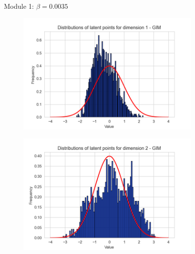 \begin{figure}[h]
\begin{subfigure}[b]{0.25\textwidth}
	\end{subfigure}
	\caption{Module 1: $\beta=0.0035$}
	\label{fig:distr_module1_beta0035}
\end{figure}
\begin{figure}[h]
	\centering
	\begin{subfigure}[b]{0.25\textwidth}
		\centering
		\includegraphics[width=1\linewidth]{"graphs/distr/module2 kld0035/_ distribution_latent_space_GIM_dim=0"}
	\end{subfigure}
	\hfill
	\begin{subfigure}[b]{0.25\textwidth}
		\centering
		\includegraphics[width=1\linewidth]{"graphs/distr/module2 kld0035/_ distribution_latent_space_GIM_dim=1"}
	\end{subfigure}
	\hfill
	\begin{subfigure}[b]{0.25\textwidth}
		\centering

\end{subfigure}
\end{figure}
